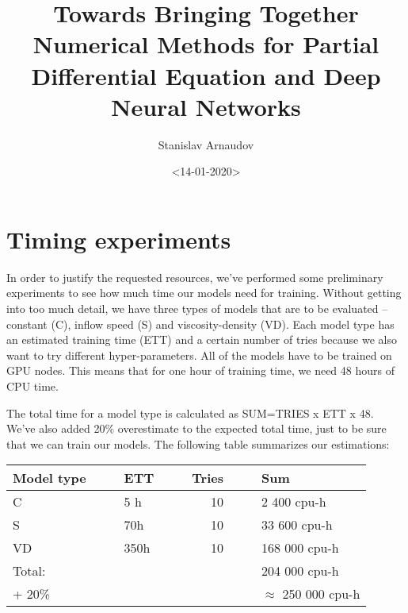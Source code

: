\documentclass{llncs}
\institute{Karlsruhe Institute of Technology,\\Kaiserstrasse 12,76131 Karlsruhe, Germany\\ \url{http://www.kit.edu/english/}}
\author{Stanislav Arnaudov}
\date{<14-01-2020>}
\title{Towards Bringing Together Numerical Methods for Partial Differential Equation and Deep Neural Networks}
\begin{document}
\maketitle


\section{Timing experiments}
\label{sec:orgf979350}

In order to justify the requested resources, we've performed some preliminary experiments to see how much time our models need for training. Without getting into too much detail, we have three types of models that are to be evaluated -- constant (C), inflow speed (S) and viscosity-density (VD). Each model type has an estimated training time (ETT) and a certain number of tries because we also want to try different hyper-parameters. All of the models have to be trained on GPU nodes. This means that for one hour of training time, we need 48 hours of CPU time.



The total time for a model type is calculated as SUM=TRIES x ETT x 48. We've also added 20\% overestimate to the expected total time, just to be sure that we can train our models. The following table summarizes our estimations:

\begin{center}
\begin{tabular}{l|lllllr|lll}
Model type &  &  & ETT &  &  & Tries &  &  & Sum\\
\hline
C &  &  & 5 h &  &  & 10 &  &  & 2 400 cpu-h\\
S &  &  & 70h &  &  & 10 &  &  & 33 600 cpu-h\\
VD &  &  & 350h &  &  & 10 &  &  & 168 000 cpu-h\\
\hline
Total: &  &  &  &  &  &  &  &  & 204 000 cpu-h\\
+ 20\% &  &  &  &  &  &  &  &  & \(\approx\) 250 000 cpu-h\\
\hline
\end{tabular}
\end{center}
\end{document}
